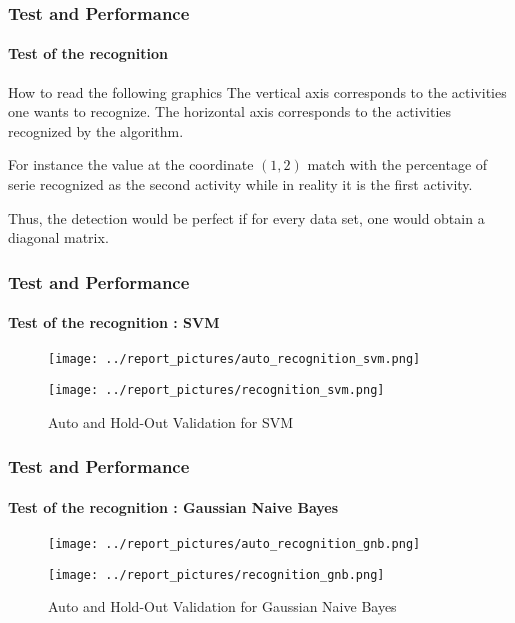 \documentclass[11pt, sans, handout]{beamer}
\begin{document}
\begin{frame}
	\frametitle{Test and Performance}
	\framesubtitle{Test of the recognition}
	
	\begin{exampleblock}{How to read the following graphics}
	The vertical axis corresponds to the activities one wants to recognize. The horizontal axis corresponds to the activities recognized by the algorithm.
	
	For instance the value at the coordinate $(1,2)$ match with the percentage of serie recognized as the second activity while in reality it is the first activity. 
	
	Thus, the detection would be perfect if for every data set, one would obtain a diagonal matrix.
	\end{exampleblock}
\end{frame}

\begin{frame}
	\frametitle{Test and Performance}
	\framesubtitle{Test of the recognition : SVM}
			
	\begin{figure}[H]
			\begin{minipage}[c]{.46\linewidth}
      			\texttt{[image: ../report\_pictures/auto\_recognition\_svm.png]}
  			\end{minipage} \hfill
   			\begin{minipage}[c]{.46\linewidth}
      			\texttt{[image: ../report\_pictures/recognition\_svm.png]}
   			\end{minipage}
		\caption{Auto and Hold-Out Validation for SVM}
		\label{svm}
	\end{figure}
	
\end{frame}

\begin{frame}
	\frametitle{Test and Performance}
	\framesubtitle{Test of the recognition : Gaussian Naive Bayes}
			
	\begin{figure}[H]
			\begin{minipage}[c]{.46\linewidth}
      			\texttt{[image: ../report\_pictures/auto\_recognition\_gnb.png]}
  			\end{minipage} \hfill
   			\begin{minipage}[c]{.46\linewidth}
      			\texttt{[image: ../report\_pictures/recognition\_gnb.png]}
   			\end{minipage}
		\caption{Auto and Hold-Out Validation for Gaussian Naive Bayes}
		\label{gnb}
	\end{figure}
	
\end{frame}
\end{document}
